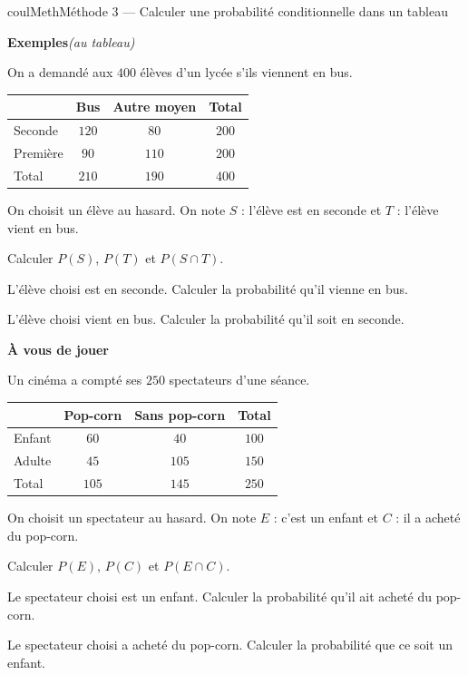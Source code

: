 \documentclass[11pt,a4paper]{article}
\makeatletter
\newcounter{lycee@signet}
\newcommand{\signet}[3][]{\stepcounter{lycee@signet}%
  \edef\lycee@dest{\if\relax\detokenize{#1}\relax
    signet.\arabic{lycee@signet}\else#1\fi}%
  \hypertarget{\lycee@dest}{}\bookmark[level=#2,dest=\lycee@dest]{#3}}
\newcounter{methode}
\newenvironment{methodebox}[1][Méthode]{\stepcounter{methode}%
  \begin{boitecours}[phantom={\signet[methode-\arabic{methode}]{2}{#1}}]{coulMeth}{#1}}%
  {\end{boitecours}}
\newcommand{\etape}[1]{\par\smallskip\textbf{\color{coulMeth}#1}\par\nobreak\smallskip}
\newcommand{\autableau}{\hfill{\footnotesize\itshape\color{black!45}(au tableau)}}
\newcommand{\etapeexemples}{%
    \par\smallskip\textbf{\color{coulMeth}Exemples}\autableau\par\nobreak\smallskip}
\makeatother
\begin{document}
\begin{methodebox}[Méthode 3 --- Calculer une probabilité conditionnelle dans un tableau]
\etapeexemples
On a demandé aux $400$ élèves d'un lycée s'ils viennent en bus.
\begin{center}
\renewcommand{\arraystretch}{1.3}
\begin{tabular}{|l|c|c|c|}
\hline
 & Bus & Autre moyen & Total\\\hline
Seconde & $120$ & $80$ & $200$\\\hline
Première & $90$ & $110$ & $200$\\\hline
Total & $210$ & $190$ & $400$\\\hline
\end{tabular}
\end{center}
On choisit un élève au hasard. On note $S$ : \og l'élève est en seconde\fg{} et
$T$ : \og l'élève vient en bus\fg.
\begin{questions}[label=\alph*)]
  \item Calculer $P(S)$, $P(T)$ et $P(S\cap T)$.
  \item L'élève choisi est en seconde. Calculer la probabilité qu'il vienne en bus.
  \item L'élève choisi vient en bus. Calculer la probabilité qu'il soit en seconde.
\end{questions}

\etape{À vous de jouer}
Un cinéma a compté ses $250$ spectateurs d'une séance.
\begin{center}
\renewcommand{\arraystretch}{1.3}
\begin{tabular}{|l|c|c|c|}
\hline
 & Pop-corn & Sans pop-corn & Total\\\hline
Enfant & $60$ & $40$ & $100$\\\hline
Adulte & $45$ & $105$ & $150$\\\hline
Total & $105$ & $145$ & $250$\\\hline
\end{tabular}
\end{center}
On choisit un spectateur au hasard. On note $E$ : \og c'est un enfant\fg{} et
$C$ : \og il a acheté du pop-corn\fg.
\begin{questions}[label=\alph*)]
  \item Calculer $P(E)$, $P(C)$ et $P(E\cap C)$.
  \item Le spectateur choisi est un enfant. Calculer la probabilité qu'il ait acheté du
    pop-corn.
  \item Le spectateur choisi a acheté du pop-corn. Calculer la probabilité que ce soit
    un enfant.
\end{questions}

\end{methodebox}
\end{document}
